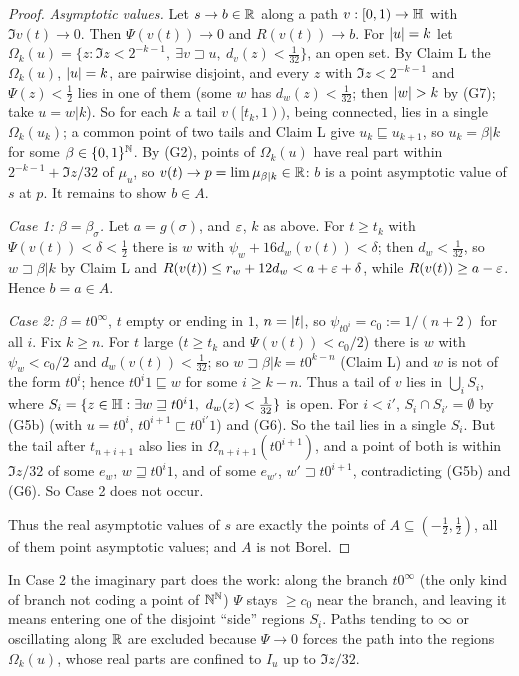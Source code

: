 \begin{proof}
\emph{Asymptotic values.} Let $s\to b\in\mathbb{R}$ along a path $v:[0,1)\to\mathbb{H}$ with $\Im v(t)\to0$. Then $\Psi(v(t))\to0$ and $R(v(t))\to b$. For
$\lvert u\rvert=k$ let $\Omega_k(u)=\{z:\Im z<2^{-k-1},\ \exists v\sqsupset u,\ d_v(z)<\frac1{32}\}$, an open set. By Claim L the $\Omega_k(u)$,
$\lvert u\rvert=k$, are pairwise disjoint, and every $z$ with $\Im z<2^{-k-1}$ and $\Psi(z)<\frac12$ lies in one of them (some $w$ has
$d_w(z)<\frac1{32}$; then $\lvert w\rvert>k$ by (G7); take $u=w|k$). So for each $k$ a tail $v([t_k,1))$, being connected, lies in a single
$\Omega_k(u_k)$; a common point of two tails and Claim L give $u_k\sqsubseteq u_{k+1}$, so $u_k=\beta|k$ for some $\beta\in\{0,1\}^{\mathbb{N}}$.
By (G2), points of $\Omega_k(u)$ have real part within $2^{-k-1}+\Im z/32$ of $\mu_u$, so $v(t)\to p=\lim\mu_{\beta|k}\in\mathbb{R}$: $b$ is a point
asymptotic value of $s$ at $p$. It remains to show $b\in A$.

\emph{Case 1: $\beta=\beta_\sigma$.} Let $a=g(\sigma)$, and $\varepsilon$, $k$ as above. For $t\ge t_k$ with $\Psi(v(t))<\delta<\frac12$ there is $w$
with $\psi_w+16d_w(v(t))<\delta$; then $d_w<\frac1{32}$, so $w\sqsupset\beta|k$ by Claim L and $R(v(t))\le r_w+12d_w<a+\varepsilon+\delta$, while
$R(v(t))\ge a-\varepsilon$. Hence $b=a\in A$.

\emph{Case 2: $\beta=t0^\infty$}, $t$ empty or ending in $1$, $n=\lvert t\rvert$, so $\psi_{t0^i}=c_0:=1/(n+2)$ for all $i$. Fix $k\ge n$. For $t$ large
($t\ge t_k$ and $\Psi(v(t))<c_0/2$) there is $w$ with $\psi_w<c_0/2$ and $d_w(v(t))<\frac1{32}$; so $w\sqsupset\beta|k=t0^{k-n}$ (Claim L)
and $w$ is not of the form $t0^i$; hence $t0^i1\sqsubseteq w$ for some $i\ge k-n$. Thus a tail of $v$ lies in $\bigcup_iS_i$, where
$S_i=\{z\in\mathbb{H}:\exists w\sqsupseteq t0^i1,\ d_w(z)<\frac1{32}\}$ is open. For $i<i'$, $S_i\cap S_{i'}=\emptyset$ by (G5b) (with $u=t0^i$,
$t0^{i+1}\sqsubset t0^{i'}1$) and (G6). So the tail lies in a single $S_i$. But the tail after $t_{n+i+1}$ also lies in
$\Omega_{n+i+1}(t0^{i+1})$, and a point of both is within $\Im z/32$ of some $e_w$, $w\sqsupseteq t0^i1$, and of some $e_{w'}$,
$w'\sqsupset t0^{i+1}$, contradicting (G5b) and (G6). So Case 2 does not occur.

Thus the real asymptotic values of $s$ are exactly the points of $A\subseteq(-\frac12,\frac12)$, all of them point asymptotic values; and
$A$ is not Borel.
\end{proof}

\begin{remark}
In Case 2 the imaginary part does the work: along the branch $t0^\infty$ (the only kind of branch not coding a point of $\mathbb{N}^{\mathbb{N}}$)
$\Psi$ stays $\ge c_0$ near the branch, and leaving it means entering one of the disjoint ``side'' regions $S_i$. Paths tending to
$\infty$ or oscillating along $\mathbb{R}$ are excluded because $\Psi\to0$ forces the path into the regions $\Omega_k(u)$, whose real parts
are confined to $I_u$ up to $\Im z/32$.
\end{remark}

